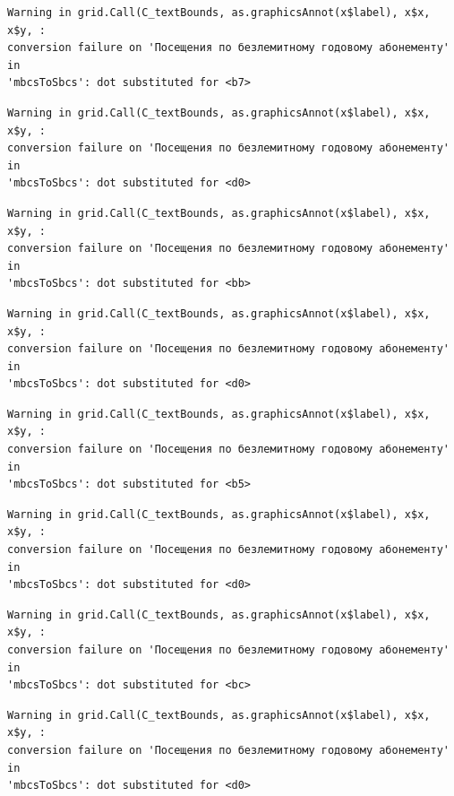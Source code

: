 \documentclass[
  letterpaper,
  DIV=11,
  numbers=noendperiod]{scrartcl}
\begin{document}
\begin{verbatim}
Warning in grid.Call(C_textBounds, as.graphicsAnnot(x$label), x$x, x$y, :
conversion failure on 'Посещения по безлемитному годовому абонементу' in
'mbcsToSbcs': dot substituted for <b7>
\end{verbatim}

\begin{verbatim}
Warning in grid.Call(C_textBounds, as.graphicsAnnot(x$label), x$x, x$y, :
conversion failure on 'Посещения по безлемитному годовому абонементу' in
'mbcsToSbcs': dot substituted for <d0>
\end{verbatim}

\begin{verbatim}
Warning in grid.Call(C_textBounds, as.graphicsAnnot(x$label), x$x, x$y, :
conversion failure on 'Посещения по безлемитному годовому абонементу' in
'mbcsToSbcs': dot substituted for <bb>
\end{verbatim}

\begin{verbatim}
Warning in grid.Call(C_textBounds, as.graphicsAnnot(x$label), x$x, x$y, :
conversion failure on 'Посещения по безлемитному годовому абонементу' in
'mbcsToSbcs': dot substituted for <d0>
\end{verbatim}

\begin{verbatim}
Warning in grid.Call(C_textBounds, as.graphicsAnnot(x$label), x$x, x$y, :
conversion failure on 'Посещения по безлемитному годовому абонементу' in
'mbcsToSbcs': dot substituted for <b5>
\end{verbatim}

\begin{verbatim}
Warning in grid.Call(C_textBounds, as.graphicsAnnot(x$label), x$x, x$y, :
conversion failure on 'Посещения по безлемитному годовому абонементу' in
'mbcsToSbcs': dot substituted for <d0>
\end{verbatim}

\begin{verbatim}
Warning in grid.Call(C_textBounds, as.graphicsAnnot(x$label), x$x, x$y, :
conversion failure on 'Посещения по безлемитному годовому абонементу' in
'mbcsToSbcs': dot substituted for <bc>
\end{verbatim}

\begin{verbatim}
Warning in grid.Call(C_textBounds, as.graphicsAnnot(x$label), x$x, x$y, :
conversion failure on 'Посещения по безлемитному годовому абонементу' in
'mbcsToSbcs': dot substituted for <d0>
\end{verbatim}
\end{document}
